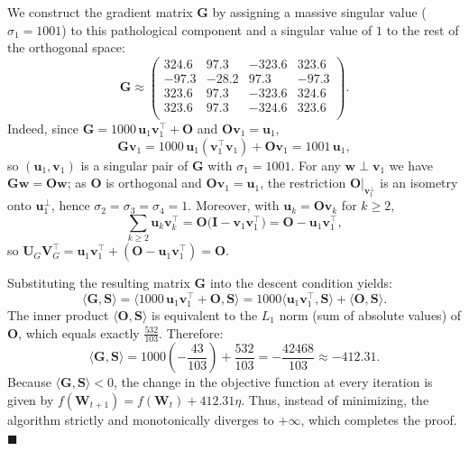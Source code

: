 \documentclass[letterpaper]{article} %
\begin{document}
We construct the gradient matrix $\mathbf{G}$ by assigning a massive singular value ($\sigma_1 = 1001$) to this pathological component and a singular value of $1$ to the rest of the orthogonal space:
\begin{equation}
    \mathbf{G} \approx \begin{pmatrix}
        324.6 & 97.3 & -323.6 & 323.6 \\
        -97.3 & -28.2 & 97.3 & -97.3 \\
        323.6 & 97.3 & -323.6 & 324.6 \\
        323.6 & 97.3 & -324.6 & 323.6 \\
      \end{pmatrix}.
\end{equation}
Indeed, since $\mathbf{G}=1000\,\mathbf{u}_1\mathbf{v}_1^\top+\mathbf{O}$ and $\mathbf{O}\mathbf{v}_1=\mathbf{u}_1$,
\[
\mathbf{G}\mathbf{v}_1 = 1000\,\mathbf{u}_1(\mathbf{v}_1^\top\mathbf{v}_1)+\mathbf{O}\mathbf{v}_1 = 1001\,\mathbf{u}_1,
\]
so $(\mathbf{u}_1,\mathbf{v}_1)$ is a singular pair of $\mathbf{G}$ with $\sigma_1=1001$. For any $\mathbf{w}\perp\mathbf{v}_1$ we have
$\mathbf{G}\mathbf{w}=\mathbf{O}\mathbf{w}$; as $\mathbf{O}$ is orthogonal and $\mathbf{O}\mathbf{v}_1=\mathbf{u}_1$, the restriction
$\mathbf{O}|_{\mathbf{v}_1^\perp}$ is an isometry onto $\mathbf{u}_1^\perp$, hence $\sigma_2=\sigma_3=\sigma_4=1$. Moreover, with
$\mathbf{u}_k=\mathbf{O}\mathbf{v}_k$ for $k\ge2$,
\[
\textstyle\sum_{k\ge2}\mathbf{u}_k\mathbf{v}_k^\top=\mathbf{O}\bigl(\mathbf{I}-\mathbf{v}_1\mathbf{v}_1^\top\bigr)=\mathbf{O}-\mathbf{u}_1\mathbf{v}_1^\top,  
\]
so $\mathbf{U}_G\mathbf{V}_G^\top=\mathbf{u}_1\mathbf{v}_1^\top+(\mathbf{O}-\mathbf{u}_1\mathbf{v}_1^\top)=\mathbf{O}$.

Substituting the resulting matrix $\mathbf{G}$ into the descent condition yields:
\begin{equation}
\langle \mathbf{G}, \mathbf{S} \rangle = \langle 1000 \, \mathbf{u}_1 \mathbf{v}_1^\top + \mathbf{O}, \mathbf{S} \rangle = 1000 \langle \mathbf{u}_1 \mathbf{v}_1^\top, \mathbf{S} \rangle + \langle \mathbf{O}, \mathbf{S} \rangle.
\end{equation}
The inner product $\langle \mathbf{O}, \mathbf{S} \rangle$ is equivalent to the $L_1$ norm (sum of absolute values) of $\mathbf{O}$, which equals exactly $\frac{532}{103}$. Therefore:
\begin{equation}
\langle \mathbf{G}, \mathbf{S} \rangle = 1000 \left(-\frac{43}{103}\right) + \frac{532}{103} = -\frac{42468}{103} \approx -412.31.
\end{equation}
Because $\langle \mathbf{G}, \mathbf{S} \rangle < 0$, the change in the objective function at every iteration is given by $f(\mathbf{W}_{t+1}) = f(\mathbf{W}_t) + 412.31 \eta$. Thus, instead of minimizing, the algorithm strictly and monotonically diverges to $+\infty$, which completes the proof. $\blacksquare$
\end{document}

